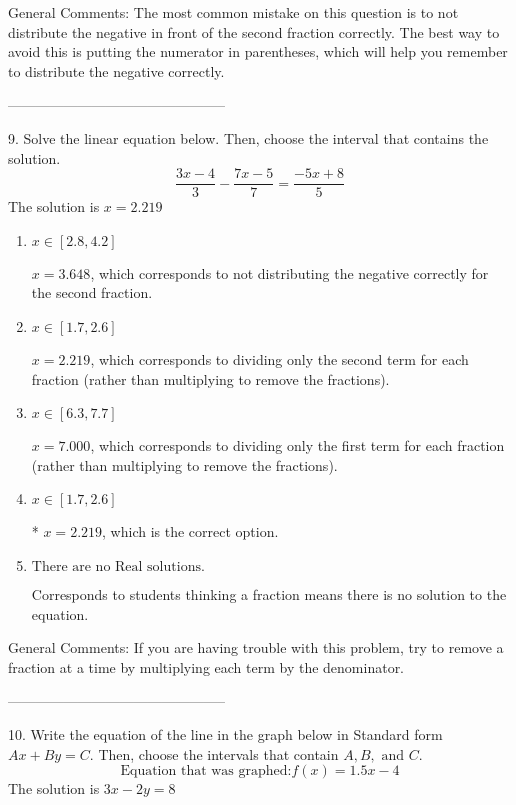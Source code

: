 \documentclass{extbook}[14pt]
\begin{document}
General Comments: The most common mistake on this question is to not distribute the negative in front of the second fraction correctly. The best way to avoid this is putting the numerator in parentheses, which will help you remember to distribute the negative correctly.

-----------------------------------------------

9. Solve the linear equation below. Then, choose the interval that contains the solution.
\[ \frac{3 x - 4}{3} - \frac{7 x - 5}{7} = \frac{-5 x + 8}{5} \] 
The solution is $ x = 2.219 $ 

\begin{enumerate}[label=\Alph*.] 
\item $ x \in [2.8, 4.2] $ 

  $x = 3.648$, which corresponds to not distributing the negative correctly for the second fraction. 
\item $ x \in [1.7, 2.6] $ 

  $x = 2.219$, which corresponds to dividing only the second term for each fraction (rather than multiplying to remove the fractions). 
\item $ x \in [6.3, 7.7] $ 

  $x = 7.000$, which corresponds to dividing only the first term for each fraction (rather than multiplying to remove the fractions). 
\item $ x \in [1.7, 2.6] $ 

 * $x = 2.219$, which is the correct option. 
\item $ \text{There are no Real solutions.} $ 

 Corresponds to students thinking a fraction means there is no solution to the equation. 
\end{enumerate} 
 
General Comments: If you are having trouble with this problem, try to remove a fraction at a time by multiplying each term by the denominator.

-----------------------------------------------

10. Write the equation of the line in the graph below in Standard form $Ax+By=C$. Then, choose the intervals that contain $A, B, \text{ and } C$.
\[ \text{Equation that was graphed:} f(x)= 1.5 x - 4 \] 
The solution is $ 3 x - 2 y = 8 $ 
\end{document}
